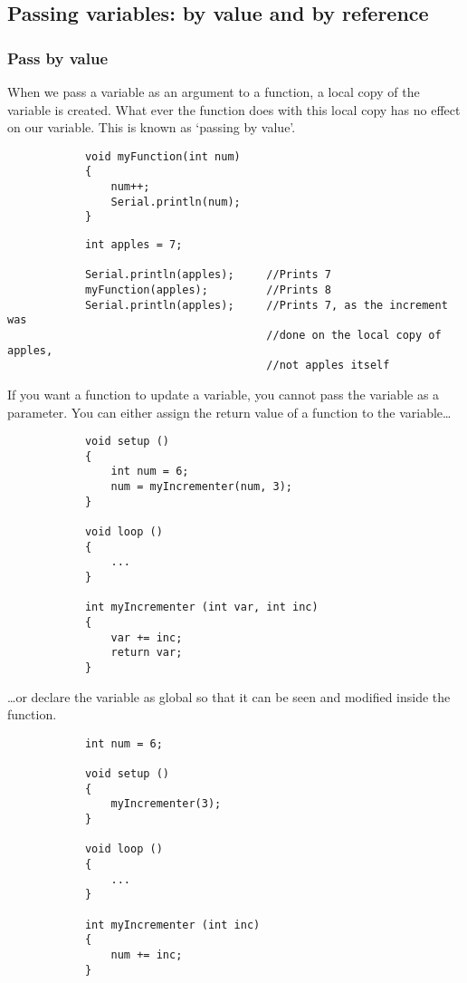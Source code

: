 \documentclass{article}
\begin{document}
	\subsection{Passing variables: by value and by reference}

		\subsubsection{Pass by value}

			When we pass a variable as an argument to a function, a local copy of the variable is created. What ever the function does with this local copy has no effect on our variable. This is known as `passing by value'.

			\begin{lstlisting}
			void myFunction(int num)
			{
				num++;
				Serial.println(num);
			}
			\end{lstlisting}

			\begin{lstlisting}
			int apples = 7;

			Serial.println(apples);		//Prints 7
			myFunction(apples);			//Prints 8
			Serial.println(apples);		//Prints 7, as the increment was
										//done on the local copy of apples,
										//not apples itself
			\end{lstlisting}

			If you want a function to update a variable, you cannot pass the variable as a parameter. You can either assign the return value of a function to the variable\ldots

			\begin{lstlisting}
			void setup ()
			{
				int num = 6;
				num = myIncrementer(num, 3);
			}

			void loop ()
			{
				...
			}

			int myIncrementer (int var, int inc)
			{
				var += inc;
				return var;
			}
			\end{lstlisting}

			\ldots{}or declare the variable as global so that it can be seen and modified inside the function.

			\begin{lstlisting}
			int num = 6;
			
			void setup ()
			{
				myIncrementer(3);
			}

			void loop ()
			{
				...
			}

			int myIncrementer (int inc)
			{
				num += inc;
			}
			\end{lstlisting}
\end{document}
